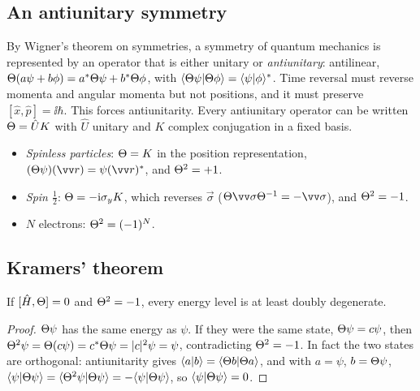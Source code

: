 \subsection{An antiunitary symmetry}
By Wigner's theorem on symmetries, a symmetry of quantum mechanics is represented by an
operator that is either unitary or \emph{antiunitary}: antilinear,
$\Theta(a\psi+b\phi)=a^{*}\Theta\psi+b^{*}\Theta\phi$, with
$\langle \Theta\psi\vert \Theta\phi\rangle=\langle \psi\vert \phi\rangle^{*}$. Time reversal must reverse momenta
and angular momenta but not positions, and it must preserve $[\hat{x},\hat{p}]=\ii\hbar$.
This forces antiunitarity. Every antiunitary operator can be written $\Theta=\hat{U}K$ with
$\hat{U}$ unitary and $K$ complex conjugation in a fixed basis.
\begin{itemize}
\item \emph{Spinless particles}: $\Theta=K$ in the position representation,
      $(\TR\psi)(\vec{r})=\psi(\vec{r})^{*}$, and $\Theta^2=+1$.
\item \emph{Spin $\tfrac12$}: $\Theta=-\mathrm{i}\sigma_yK$, which reverses $\vec{\sigma}$
      ($\TR\vec{\sigma}\TR^{-1}=-\vec{\sigma}$), and $\Theta^2=-1$.
\item $N$ electrons: $\Theta^2=(-1)^N$.
\end{itemize}

\subsection{Kramers' theorem}\label{sec:kramers}
\begin{theorem}[Kramers]
If $[\hat{H},\Theta]=0$ and $\Theta^2=-1$, every energy level is at least doubly degenerate.
\end{theorem}
\begin{proof}
$\Theta\psi$ has the same energy as $\psi$. If they were the same state,
$\Theta\psi=c\psi$, then $\Theta^2\psi=\Theta(c\psi)=c^{*}\Theta\psi=\lvert c\rvert^2\psi=\psi$,
contradicting $\Theta^2=-1$. In fact the two states are orthogonal: antiunitarity gives
$\langle a\vert b\rangle=\langle \Theta b\vert \Theta a\rangle$, and with $a=\psi$, $b=\Theta\psi$,
$\langle \psi\vert \Theta\psi\rangle=\langle \Theta^2\psi\vert \Theta\psi\rangle=-\langle \psi\vert \Theta\psi\rangle$, so
$\langle \psi\vert \Theta\psi\rangle=0$.
\end{proof}

